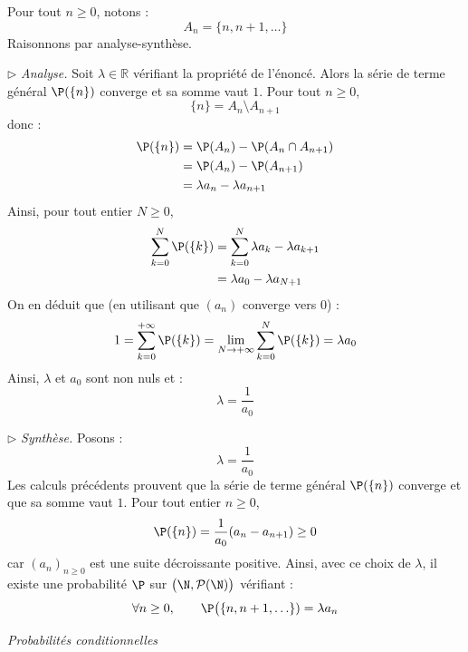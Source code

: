 \documentclass[a4paper,10pt]{report}
\begin{document}
\corr Pour tout $n \geq 0$, notons :
$$ A_n = \lbrace n, n+1, \ldots \rbrace$$
Raisonnons par analyse-synthèse.

\medskip

\noindent $\rhd$ \textit{Analyse.} Soit $\lambda \in \mathbb{R}$ vérifiant la propriété de l'énoncé. Alors la série de terme général $\P (\lbrace n \rbrace)$ converge et sa somme vaut $1$. Pour tout $n \geq 0$,
$$ \lbrace n \rbrace = A_n \setminus A_{n+1}$$
donc :
\begin{align*}
 \P (\lbrace n \rbrace) & = \P (A_n) - \P (A_n \cap A_{n+1}) \\
 & = \P (A_n) - \P (A_{n+1}) \\
 & = \lambda a_n - \lambda a_{n+1}
 \end{align*}
Ainsi, pour tout entier $N \geq 0$,
\begin{align*}
\sum_{k=0}^N  \P (\lbrace k \rbrace) & = \sum_{k=0}^N\lambda a_k - \lambda a_{k+1} \\
& = \lambda a_0 - \lambda a_{N+1} 
\end{align*}
On en déduit que (en utilisant que $(a_n)$ converge vers $0$) :
$$ 1 = \sum_{k=0}^{+ \infty}  \P (\lbrace k \rbrace) = \lim_{N \rightarrow + \infty} \sum_{k=0}^N  \P (\lbrace k \rbrace) = \lambda a_0$$
Ainsi, $\lambda$ et $a_0$ sont non nuls et :
$$ \lambda = \dfrac{1}{a_0}$$

\medskip

\noindent $\rhd$ \textit{Synthèse.} Posons :
$$ \lambda = \dfrac{1}{a_0}$$
Les calculs précédents prouvent que la série de terme général $\P( \lbrace n \rbrace)$ converge et que sa somme vaut $1$. Pour tout entier $n \geq 0$,
$$ \P( \lbrace n \rbrace) = \dfrac{1}{a_0} (a_n - a_{n+1}) \geq 0$$
car $(a_n)_{n \geq 0}$ est une suite décroissante positive. Ainsi, avec ce choix de $\lambda$, il existe une probabilité $\P$ sur $\bigl(\N,\mathcal{P}(\N)\bigr)$ vérifiant :
    \[
    \forall n \geq 0, \qquad \P\bigl( \lbrace n, n+1, \ldots \rbrace) = \lambda a_n
    \]
    


\newpage

\medskip

\begin{center}
\textit{{ {\large Probabilités conditionnelles}}}
\end{center}

\medskip
\end{document}
